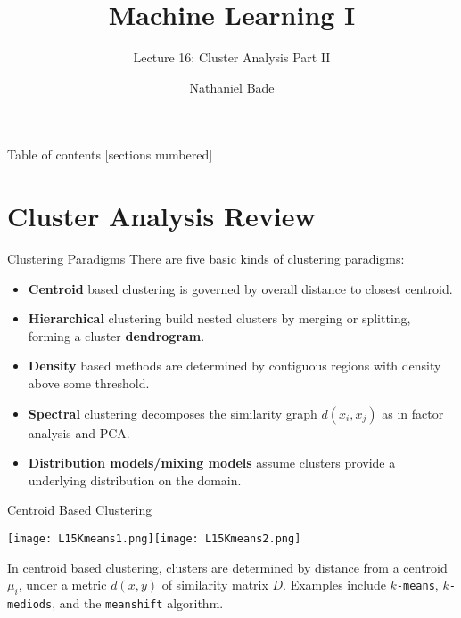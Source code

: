 \documentclass[10pt, table, dvipsnames,xcdraw, handout]{beamer}
\title{Machine Learning I}
\subtitle{Lecture 16: Cluster Analysis Part II}
\date{}
\author{Nathaniel Bade}
\institute{Northeastern University Department of Mathematics}
\begin{document}
\maketitle

\begin{frame}{Table of contents}
  [sections numbered]
  \tableofcontents[hideallsubsections]
\end{frame}




%
% 
%
%
%
%
%


\section{Cluster Analysis Review}


\begin{frame}[fragile]{Clustering Paradigms}
There are five basic kinds of clustering paradigms: 
\begin{itemize}
\item[] \textbf{Centroid} based clustering is governed by overall distance to closest centroid.\pause
\item[] \textbf{Hierarchical} clustering build nested clusters by merging or splitting, forming a cluster \textbf{dendrogram}.\pause
\item[] \textbf{Density} based methods are determined by contiguous regions with density above some threshold.\pause
\item[] \textbf{Spectral} clustering decomposes the similarity graph $d(x_i,x_j)$ as in factor analysis and PCA.\pause
\item[] \textbf{Distribution models/mixing models} assume clusters provide a underlying distribution on the domain.
\end{itemize}
\end{frame}

\begin{frame}[fragile]{Centroid Based Clustering}
  \begin{minipage}[t][0.5\textheight][t]{\textwidth}
	\centering \texttt{[image: L15Kmeans1.png]}\hspace{1em}\texttt{[image: L15Kmeans2.png]} 
  \end{minipage}
  \vfill
\begin{minipage}[t][0.5\textheight][t]{\textwidth}
In centroid based clustering, clusters are determined by distance from a centroid $\mu_i$, under a metric $d(x,y)$ of similarity matrix $D$. \pause Examples include \texttt{$k$-means}, \texttt{$k$-mediods}, and the \texttt{meanshift} algorithm. 
\end{minipage}
\end{frame}
\end{document}
